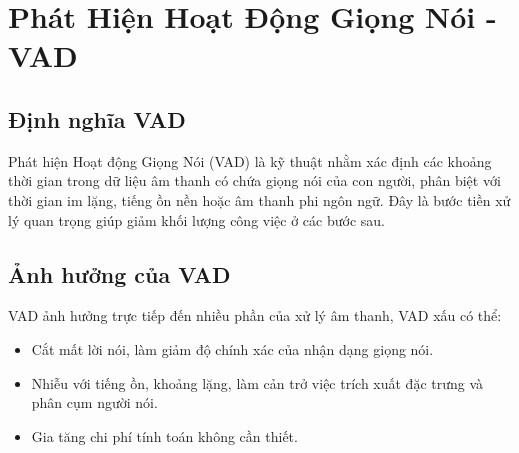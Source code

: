 \section{Phát Hiện Hoạt Động Giọng Nói - VAD}
\subsection{Định nghĩa VAD}
Phát hiện Hoạt động Giọng Nói (VAD) là kỹ thuật nhằm xác định các khoảng thời gian trong dữ liệu âm thanh có chứa giọng nói của con người, phân biệt với thời gian im lặng, tiếng ồn nền hoặc âm thanh phi ngôn ngữ. Đây là bước tiền xử lý quan trọng giúp giảm khối lượng công việc ở các bước sau. 
\subsection{Ảnh hưởng của VAD}
VAD ảnh hưởng trực tiếp đến nhiều phần của xử lý âm thanh, VAD xấu có thể:
\begin{itemize}[label={}]
    \item Cắt mất lời nói, làm giảm độ chính xác của nhận dạng giọng nói.
    \item Nhiễu với tiếng ồn, khoảng lặng, làm cản trở việc trích xuất đặc trưng và phân cụm người nói.
    \item Gia tăng chi phí tính toán không cần thiết.
\end{itemize}